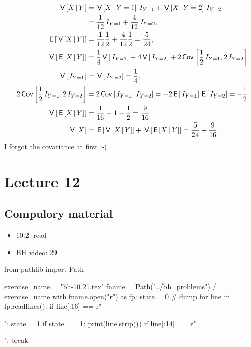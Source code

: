 \begin{exercise}
\begin{solution}
\begin{align}
\,\mathsf{V}\left[X\,\middle|\, Y\right] &= \,\mathsf{V}\left[X\,\middle|\, Y=1\right]\,I_{Y=1} + \,\mathsf{V}\left[X\,\middle|\, Y=2\right]\,I_{Y=2} \\
&= \frac{1}{12} \,I_{Y=1} + \frac{4}{12} \,I_{Y=2}, \\
\,\mathsf{E}\left[\,\mathsf{V}\left[X\,\middle|\, Y\right]\right] &= \frac{1}{12} \frac{1}{2} + \frac{4}{12} \frac{1}{2} = \frac{5}{24}, \\
\,\mathsf{V}\left[\,\mathsf{E}\left[X \,\middle|\, Y\right]\right] &= \frac{1}{4}\,\mathsf{V}\left[\,I_{Y=1}\right] + 4\,\mathsf{V}\left[\,I_{Y=2}\right] + 2\,\mathsf{Cov}\left[\frac{1}{2}\,I_{Y=1}, 2\,I_{Y=2}\right] \\
\,\mathsf{V}\left[\,I_{Y=1}\right] &= \,\mathsf{V}\left[\,I_{Y=2}\right]  = \frac{1}{4}, \\
2\,\mathsf{Cov}\left[\frac{1}{2}\,I_{Y=1}, 2\,I_{Y=2}\right] &= 2\,\mathsf{Cov}\left[\,I_{Y=1}, \,I_{Y=2}\right]=-2\,\mathsf{E}\left[\,I_{Y=1}\right]\,\mathsf{E}\left[\,I_{Y=2}\right] = -\frac{1}{2}\\
\,\mathsf{V}\left[\,\mathsf{E}\left[X \,\middle|\, Y\right]\right] &= \frac{1}{16} + 1 - \frac{1}{2} = \frac{9}{16}\\
\,\mathsf{V}\left[X\right] &= \,\mathsf{E}\left[\,\mathsf{V}\left[X\,\middle|\, Y\right]\right] + \,\mathsf{V}\left[\,\mathsf{E}\left[X\,\middle|\, Y\right]\right] = \frac{5}{24} + \frac{9}{16}.
\end{align}
I forgot the covariance at first :-(
\end{solution}
\end{exercise}


\section{Lecture 12}


\subsection{Compulory material}
\label{sec:compulory-material}


\begin{itemize}
\item 10.2: read
\item BH video: 29
\end{itemize}



\begin{pycode}
from pathlib import Path

exercise_name = "bh-10.21.tex"
fname = Path("../bh_problems") / exercise_name
with fname.open("r") as fp:
    state = 0  # dump
    for line in fp.readlines():
        if line[:16] == r"\begin{exercise}":
            state = 1
        if state == 1:
            print(line.strip())
        if line[:14] == r"\end{exercise}":
            break
\end{pycode}


